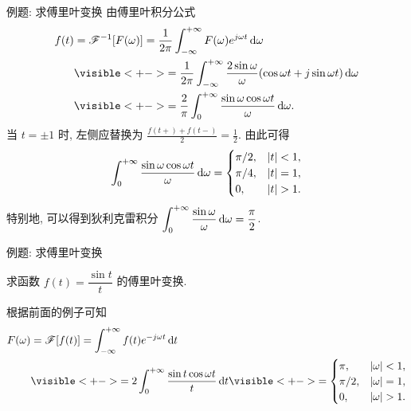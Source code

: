 \begin{frame}{例题: 求傅里叶变换}
	\onslide<+->
	由傅里叶积分公式
	\begin{align*}
		f(t)&=\msf^{-1}[F(\omega)]=\frac1{2\pi}\int_{-\infty}^{+\infty}F(\omega)e^{j\omega t}\diff\omega\\
		&\visible<+->{=\frac1{2\pi}\int_{-\infty}^{+\infty}\frac{2\sin\omega}{\omega}(\cos\omega t+j\sin\omega t)\diff \omega}\\
		&\visible<+->{=\frac2\pi\int_0^{+\infty}\frac{\sin\omega\cos\omega t}{\omega}\diff \omega.}
	\end{align*}
	\onslide<+->
	当 $t=\pm1$ 时, 左侧应替换为 $\frac{f(t+)+f(t-)}2=\frac12$.
	\onslide<+->
	由此可得
	\[\int_0^{+\infty}\frac{\sin \omega\cos\omega t}\omega\diff\omega=\begin{cases}
		\pi/2,&|t|<1,\\
		\pi/4,&|t|=1,\\
		0,&|t|>1.
	\end{cases}\]
	\onslide<+->
	特别地, 可以得到狄利克雷积分
	$\displaystyle\int_0^{+\infty}\frac{\sin\omega}\omega\,\mathrm{d}\omega=\frac\pi2$.
\end{frame}


\begin{frame}{例题: 求傅里叶变换}
	\onslide<+->
	\begin{example}
		求函数 $f(t)=\dfrac{\sin t}{t}$ 的傅里叶变换.
	\end{example}

	\onslide<+->
	\begin{solution}
		根据前面的例子可知
		\vspace{-\baselineskip}
		\begin{align*}
			F(\omega)&=\msf[f(t)]=\int_{-\infty}^{+\infty}f(t)e^{-j\omega t}\diff t\\
			&\visible<+->{=2\int_0^{+\infty}\frac{\sin t\cos\omega t}{t}\diff t}
			\visible<+->{=\begin{cases}
				\pi,&|\omega|<1,\\
				\pi/2,&|\omega|=1,\\
				0,&|\omega|>1.
				\end{cases}}
		\end{align*}
	\end{solution}
\end{frame}


